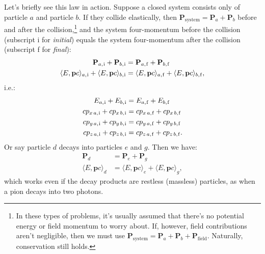 \documentclass[12pt]{article}
\renewcommand{\vv}[1]{\mathbf{#1}}
\begin{document}
Let's briefly see this law in action. Suppose a closed system consists only of particle $a$ and particle $b$. If they collide elastically, then $\vv P_{\mathrm{system}} = \vv P_a + \vv P_b$ before and after the collision,\footnote{In these types of problems, it's usually assumed that there's no potential energy or field momentum to worry about. If, however, field contributions aren't negligible, then we must use $\vv P_{\mathrm{system}} = \vv P_a + \vv P_b + \vv P_{\mathrm{field}}$. Naturally, conservation still holds.} and the system four-momentum before the collision (subscript i for \emph{initial}) equals the system four-momentum after the collision (subscript f for \emph{final}):
\begin{equation*}
\begin{aligned}
\vv P_{a, \mkern1mu \mathrm{i}} + \vv P_{b, \mkern1mu \mathrm{i}} &= \vv P_{a, \mkern1mu \mathrm{f}} + \vv P_{b, \mkern1mu \mathrm{f}}\\
\langle E, \vv p c \rangle_{a, \mkern1mu \mathrm{i}} + \langle E, \vv p c \rangle_{b, \mkern1mu \mathrm{i}} &= \langle E, \vv p c \rangle_{a, \mkern1mu \mathrm{f}} + \langle E, \vv p c \rangle_{b, \mkern1mu \mathrm{f}},
\end{aligned}
\end{equation*}
i.e.:
\begin{equation*}
\begin{split}
E_{a, \mkern1mu \mathrm{i}} + E_{b, \mkern1mu \mathrm{i}} &= E_{a, \mkern1mu \mathrm{f}} + E_{b, \mkern1mu \mathrm{f}}\\
cp_{x\,a, \mkern1mu \mathrm{i}} + cp_{x\,b, \mkern1mu \mathrm{i}} &= cp_{x\,a, \mkern1mu \mathrm{f}} + cp_{x\,b, \mkern1mu \mathrm{f}}\\
cp_{y\,a, \mkern1mu \mathrm{i}} + cp_{y\,b, \mkern1mu \mathrm{i}} &= cp_{y\,a, \mkern1mu \mathrm{f}} + cp_{y\,b, \mkern1mu \mathrm{f}}\\
cp_{z\,a, \mkern1mu \mathrm{i}} + cp_{z\,b, \mkern1mu \mathrm{i}} &= cp_{z\,a, \mkern1mu \mathrm{f}} + cp_{z\,b, \mkern1mu \mathrm{f}}.
\end{split}
\end{equation*}
Or say particle $d$ decays into particles $e$ and $g$. Then we have:
\begin{equation*}
\begin{split}
\vv P_d &= \vv P_e + \vv P_g\\
\langle E, \vv p c \rangle_{d} &= \langle E, \vv p c \rangle_{e} + \langle E, \vv p c \rangle_{g},
\end{split}
\end{equation*}
which works even if the decay products are restless (massless) particles, as when a pion decays into two photons.
\end{document}
